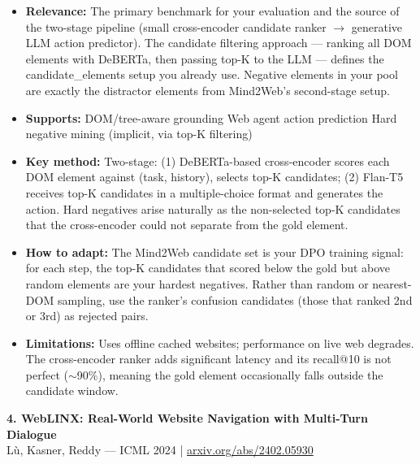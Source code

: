 \documentclass[pdflatex,sn-mathphys-num]{sn-jnl}
\theoremstyle{thmstyleone}
\theoremstyle{thmstyletwo}
\theoremstyle{thmstylethree}
\begin{document}
\begin{itemize}
    \item \textbf{Relevance:} The primary benchmark for your evaluation and the source of the two-stage pipeline (small cross-encoder candidate ranker $\rightarrow$ generative LLM action predictor). The candidate filtering approach --- ranking all DOM elements with DeBERTa, then passing top-K to the LLM --- defines the candidate\_elements setup you already use. Negative elements in your pool are exactly the distractor elements from Mind2Web's second-stage setup.
    \item \textbf{Supports:} \checkmark DOM/tree-aware grounding \checkmark Web agent action prediction \checkmark Hard negative mining (implicit, via top-K filtering)
    \item \textbf{Key method:} Two-stage: (1) DeBERTa-based cross-encoder scores each DOM element against (task, history), selects top-K candidates; (2) Flan-T5 receives top-K candidates in a multiple-choice format and generates the action. Hard negatives arise naturally as the non-selected top-K candidates that the cross-encoder could not separate from the gold element.
    \item \textbf{How to adapt:} The Mind2Web candidate set is your DPO training signal: for each step, the top-K candidates that scored below the gold but above random elements are your hardest negatives. Rather than random or nearest-DOM sampling, use the ranker's confusion candidates (those that ranked 2nd or 3rd) as rejected pairs.
    \item \textbf{Limitations:} Uses offline cached websites; performance on live web degrades. The cross-encoder ranker adds significant latency and its recall@10 is not perfect ($\sim$90\%), meaning the gold element occasionally falls outside the candidate window.
\end{itemize}

\textbf{4. WebLINX: Real-World Website Navigation with Multi-Turn Dialogue} \\
Lù, Kasner, Reddy --- ICML 2024 | \href{https://arxiv.org/abs/2402.05930}{arxiv.org/abs/2402.05930}
\end{document}
